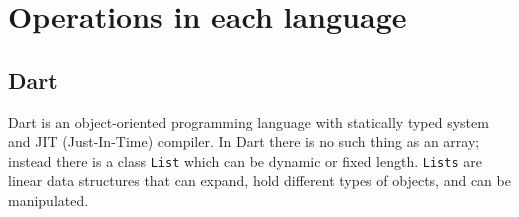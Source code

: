\documentclass{article}
\begin{document}


\section{Operations in each language}



\subsection{Dart}
Dart is an object-oriented programming language with statically typed system and JIT (Just-In-Time) compiler. In Dart there is no such thing as an array; instead there is a class \texttt{List} which can be dynamic or fixed length. \texttt{Lists} are linear data structures that can expand, hold different types of objects, and can be manipulated. 
\end{document}
